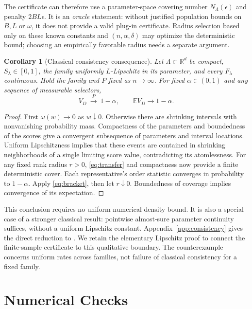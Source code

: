 \documentclass{article}
\newtheorem{corollary}[theorem]{Corollary}
\newcommand{\EE}{\mathbb E}
\newcommand{\R}{\mathbb R}
\begin{document}
The certificate can therefore use a parameter-space covering number $N_\Lambda(\epsilon)$ and penalty $2BL\epsilon$. It is an \emph{oracle} statement: without justified population bounds on $B,L$ or $\omega$, it does not provide a valid plug-in certificate. Radius selection based only on these known constants and $(n,\alpha,\delta)$ may optimize the deterministic bound; choosing an empirically favorable radius needs a separate argument.

\begin{corollary}[Classical consistency consequence]\label{cor:consistency}
Let $\Lambda\subset\R^d$ be compact, $S_\lambda\in[0,1]$, the family uniformly $L$-Lipschitz in its parameter, and every $F_\lambda$ continuous. Hold the family and $P$ fixed as $n\to\infty$. For fixed $\alpha\in(0,1)$ and any sequence of measurable selectors,
\begin{equation}
 V_D\ \xrightarrow{P}\ 1-\alpha,\qquad \EE V_D\to1-\alpha.
\end{equation}
\end{corollary}

\begin{proof}
First $\omega(w)\to0$ as $w\downarrow0$. Otherwise there are shrinking intervals with nonvanishing probability mass. Compactness of the parameters and boundedness of the scores give a convergent subsequence of parameters and interval locations. Uniform Lipschitzness implies that these events are contained in shrinking neighborhoods of a single limiting score value, contradicting its atomlessness. For any fixed rank radius $r>0$, \cref{eq:transfer} and compactness now provide a finite deterministic cover. Each representative's order statistic converges in probability to $1-\alpha$. Apply \cref{eq:bracket}, then let $r\downarrow0$. Boundedness of coverage implies convergence of its expectation.
\end{proof}

This conclusion requires no uniform numerical density bound. It is also a special case of a stronger classical result: pointwise almost-sure parameter continuity suffices, without a uniform Lipschitz constant. Appendix~\ref{app:consistency} gives the direct reduction to \citet[Lemma 2.4]{newey1994}. We retain the elementary Lipschitz proof to connect the finite-sample certificate to this qualitative boundary. The counterexample concerns uniform rates across families, not failure of classical consistency for a fixed family.

\section{Numerical Checks}
\end{document}

